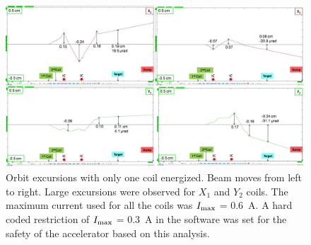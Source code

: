 \begin{singlespace}
\begin{figure}[!h]
	\begin{center}
	\includegraphics[width=15.0cm]{figures/BModMachineProtectionAllSingle}
	\end{center}
	\caption
	{Orbit excursions with only one coil energized. Beam moves from left to right. Large excursions were observed for $X_{1}$ and $Y_{2}$ coils. The maximum current used for all the coils was $I_{\rm max}$ = 0.6~A. A hard coded restriction of $I_{\rm max}$ = 0.3~A in the software was set for the safety of the accelerator based on this analysis.
	}
	\label{fig:BModMachineProtectionAllSingle}
\end{figure}
\end{singlespace}



